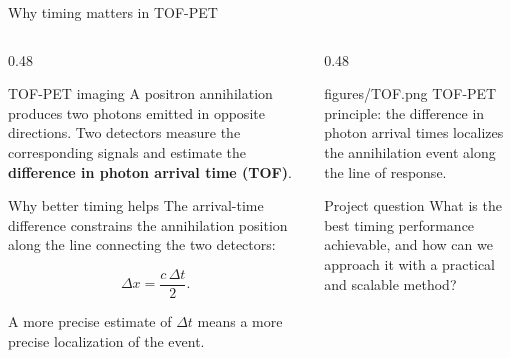 \begin{frame}{Why timing matters in TOF-PET}
\small

\begin{columns}[T,totalwidth=\textwidth]

\begin{column}{0.48\textwidth}

\begin{block}{TOF-PET imaging}
A positron annihilation produces two photons emitted in opposite directions.
Two detectors measure the corresponding signals and estimate the
\textbf{difference in photon arrival time (TOF)}.
\end{block}

\vspace{0.25em}

\begin{alertblock}{Why better timing helps}
The arrival-time difference constrains the annihilation position along the line connecting the two detectors:

\[
\Delta x = \frac{c\,\Delta t}{2}.
\]

\vspace{0.15em}
A more precise estimate of $\Delta t$ means a more precise localization of the event.
\end{alertblock}

\end{column}


\begin{column}{0.48\textwidth}
\centering

\smartimage[0.94\linewidth]{0.57\textheight}
{figures/TOF.png}
{TOF-PET principle: the difference in photon arrival times localizes the annihilation event along the line of response.}

\vspace{0.3em}

\begin{block}{Project question}
\centering
What is the best timing performance achievable,
and how can we approach it with a practical and scalable method?
\end{block}

\end{column}

\end{columns}

\end{frame}

